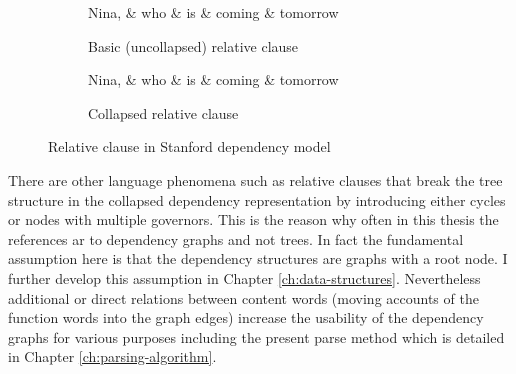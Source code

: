 \begin{figure}[!ht]
	\centering
	\begin{subfigure}{.45\textwidth}
        \begin{dependency}
            \begin{deptext}[]
                Nina, \& who \& is \& coming \& tomorrow\\ %
            \end{deptext}
        \end{dependency}
        \caption{Basic (uncollapsed) relative clause}
        \label{fig:rel-transf1}
    \end{subfigure}
	\quad
    \begin{subfigure}{.45\textwidth}
    \centering
    \begin{dependency}
        \begin{deptext}[]
            Nina, \& who \& is \& coming \& tomorrow\\ %
        \end{deptext}
    \end{dependency}
    \caption{Collapsed relative clause}
    \label{fig:rel-transf2}
\end{subfigure}
    \caption{Relative clause in Stanford dependency model}
    \label{fig:rel-transf}
\end{figure}

There are other language phenomena such as relative clauses that break the tree structure in the collapsed dependency representation by introducing either cycles or nodes with multiple governors. 
This is the reason why often in this thesis the references ar to dependency graphs and not trees. In fact the fundamental assumption here is that the dependency structures are graphs with a root node. I further develop this assumption in Chapter \ref{ch:data-structures}. Nevertheless additional or direct relations between content words (moving accounts of the function words into the graph edges) increase the usability of the dependency graphs for various purposes including the present parse method which is detailed in Chapter \ref{ch:parsing-algorithm}. 

